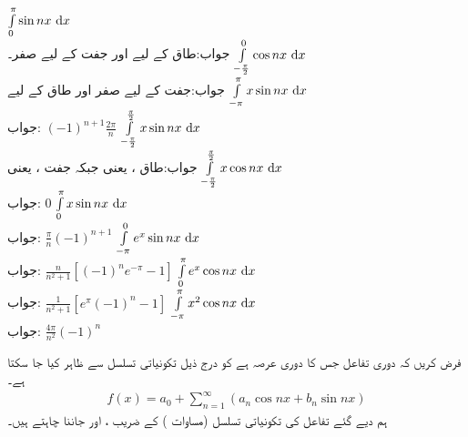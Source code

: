 \quad
$\int\limits_0^{\pi}\sin nx\,\dif x$\\
جواب:\quad طاق  کے لیے  اور جفت  کے لیے صفر۔
\quad
$\int\limits_{-\frac{\pi}{2}}^0\cos nx\,\dif x$\\
جواب:\quad جفت  کے لیے صفر اور طاق  کے لیے 
\quad
$\int\limits_{-\pi}^{\pi}x\sin nx\,\dif x$\\
جواب:\quad 
$(-1)^{n+1}\tfrac{2\pi}{n}$
\quad
$\int\limits_{-\frac{\pi}{2}}^{\frac{\pi}{2}}x\sin nx\,\dif x$\\
جواب:\quad طاق ،  یعنی  جبکہ جفت ،  یعنی 
\quad
$\int\limits_{-\frac{\pi}{2}}^{\frac{\pi}{2}}x\cos nx\,\dif x$\\
جواب:\quad 
$0$
\quad
$\int\limits_{0}^{\pi}x\sin nx\,\dif x$\\
جواب:\quad
$\tfrac{\pi}{n}(-1)^{n+1}$
\quad
$\int\limits_{-\pi}^{0} e^x\sin nx\,\dif x$\\
جواب:\quad
$\tfrac{n}{n^2+1}[(-1)^ne^{-\pi}-1]$
\quad
$\int\limits_{0}^{\pi} e^x\cos nx\,\dif x$\\
جواب:\quad
$\tfrac{1}{n^2+1}[e^{\pi}(-1)^n-1]$
\quad
$\int\limits_{-\pi}^{\pi} x^2\cos nx\,\dif x$\\
جواب:\quad
$\tfrac{4\pi}{n^2}(-1)^n$

فرض کریں کہ دوری تفاعل  جس کا دوری عرصہ  ہے کو درج ذیل تکونیاتی تسلسل سے ظاہر کیا جا سکتا ہے۔
\begin{align}\label{مساوات_فوریئر_تسلسل_الف}
f(x)=a_0+\sum_{n=1}^{\infty}(a_n\cos nx+b_n\sin nx)
\end{align}
ہم دیے گئے تفاعل  کی تکونیاتی تسلسل (مساوات ) کے  ضریب  ، اور  جاننا چاہتے ہیں۔

